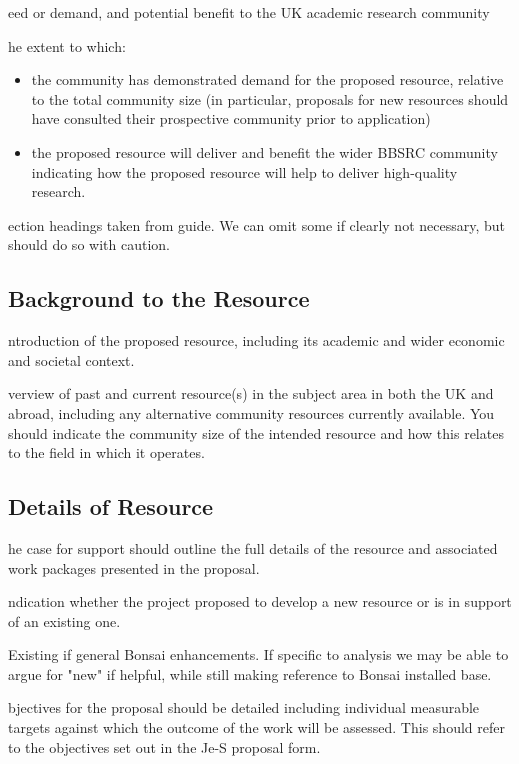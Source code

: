 \documentclass[a4paper,11point]{article}
\def\ii#1\par{{\color{blue!40}\sl #1}\par}
\def\iibf#1\par{{\color{blue!40}\sl\bfseries #1}\par}
\def\iitem#1\par{\ii\begin{itemize}[nosep]\item #1 \end{itemize}\par}
\begin{document}
\iibf Need or demand, and potential benefit to the UK academic research community

\ii The extent to which:
\begin{itemize}
    \item the community has demonstrated demand for the proposed resource, relative to the total community size (in particular, proposals for new resources should have consulted their prospective community prior to application)
    \item the proposed resource will deliver and benefit the wider BBSRC community indicating how the proposed resource will help to deliver high-quality research.
\end{itemize}


\newpage
\ii Section headings taken from guide.  We can omit some if clearly not necessary, but should do so with caution.


\subsection{Background to the Resource}
\ii Introduction of the proposed resource, including its academic and wider 
economic and societal context.

\ii Overview of past and current resource(s) in the subject area in both the UK 
and abroad, including any alternative community resources currently 
available. You should indicate the community size of the intended resource 
and how this relates to the field in which it operates.

\subsection{Details of Resource}

\ii The case for support should outline the full details of the resource and 
associated work packages presented in the proposal.

\iitem Indication whether the project proposed to develop a new
resource or is in support of an existing one.

Existing if general Bonsai enhancements.  If specific to analysis we
may be able to argue for "new" if helpful, while still making
reference to Bonsai installed base.  

\iitem Objectives for the proposal should be detailed including
individual measurable targets against which the outcome of the work
will be assessed. This should refer to the objectives set out in the
Je-S proposal form.
\end{document}
